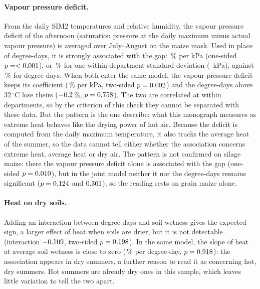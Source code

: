 \paragraph{Vapour pressure deficit.} From the daily SIM2 temperatures and relative humidity, the vapour pressure deficit of the afternoon (saturation pressure at the daily maximum minus actual vapour pressure) is averaged over July--August on the maize mask. Used in place of degree-days, it is strongly associated with the gap: \VpdPct\,\% per kPa (one-sided $p = <0.001$), or \VpdSdEffect\,\% for one within-department standard deviation (\VpdSd~kPa), against \SimSdEffect\,\% for degree-days. When both enter the same model, the vapour pressure deficit keeps its coefficient (\VpdJointPct\,\% per kPa, two-sided $p = 0.002$) and the degree-days above 32\,$^{\circ}$C lose theirs ($-0.2$\,\%, $p = 0.758$). The two are correlated at \VpdCorr{} within departments, so by the criterion of this check they cannot be separated with these data. But the pattern is the one \textcite{lobell2013} describe: what this monograph measures as extreme heat behaves like the drying power of hot air. Because the deficit is computed from the daily maximum temperature, it also tracks the average heat of the summer, so the data cannot tell either whether the association concerns extreme heat, average heat or dry air. The pattern is not confirmed on silage maize: there the vapour pressure deficit alone is associated with the gap (one-sided $p = 0.010$), but in the joint model neither it nor the degree-days remains significant ($p = 0.124$ and $0.301$), so the reading rests on grain maize alone.

\paragraph{Heat on dry soils.} Adding an interaction between degree-days and soil wetness gives the expected sign, a larger effect of heat when soils are drier, but it is not detectable (interaction $-0.109$, two-sided $p = 0.198$). In the same model, the slope of heat at average soil wetness is close to zero (\CompoundHeatPct\,\% per degree-day, $p = 0.918$): the association appears in dry summers, a further reason to read it as concerning hot, dry summers. Hot summers are already dry ones in this sample, which leaves little variation to tell the two apart.

